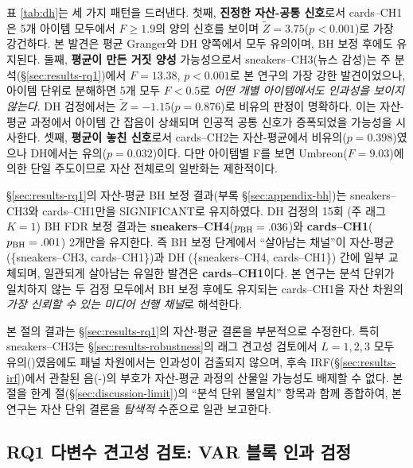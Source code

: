 \documentclass[11pt, a4paper, twocolumn]{article}
\begin{document}
표 \ref{tab:dh}는 세 가지 패턴을 드러낸다. 첫째, \textbf{진정한 자산-공통
신호}로서 cards--CH1은 5개 아이템 모두에서 $F\geq 1.9$의 양의 신호를
보이며 $\tilde{Z}=3.75$($p<0.001$)로 가장 강건하다. 본 발견은 평균
Granger와 DH 양쪽에서 모두 유의이며, BH 보정 후에도 유지된다. 둘째,
\textbf{평균이 만든 거짓 양성} 가능성으로서 sneakers--CH3(뉴스 감성)는
주 분석(\S\ref{sec:results-rq1})에서 $F=13.38$, $p<0.001$로 본 연구의
가장 강한 발견이었으나, 아이템 단위로 분해하면 5개 모두 $F<0.5$로
\emph{어떤 개별 아이템에서도 인과성을 보이지 않는다}. DH 검정에서는
$\tilde{Z}=-1.15$($p=0.876$)로 비유의 판정이 명확하다. 이는 자산-평균
과정에서 아이템 간 잡음이 상쇄되며 인공적 공통 신호가 증폭되었을
가능성을 시사한다. 셋째, \textbf{평균이 놓친 신호}로서 cards--CH2는
자산-평균에서 비유의($p=0.398$)였으나 DH에서는 유의($p=0.032$)이다.
다만 아이템별 F를 보면 Umbreon($F=9.03$)에 의한 단일 주도이므로 자산
전체로의 일반화는 제한적이다.

\S\ref{sec:results-rq1}의 자산-평균 BH 보정 결과(부록 \S\ref{sec:appendix-bh})는
sneakers--CH3와 cards--CH1만을 SIGNIFICANT로 유지하였다. DH 검정의 15회
(주 래그 $K=1$) BH FDR 보정 결과는 \textbf{sneakers--CH4}($p_{\rm BH}=.036$)와
\textbf{cards--CH1}($p_{\rm BH}=.001$) 2개만을 유지한다. 즉 BH 보정 단계에서
``살아남는 채널''이 자산-평균(\{sneakers--CH3, cards--CH1\})과 DH
(\{sneakers--CH4, cards--CH1\}) 간에 일부 교체되며, 일관되게 살아남는
유일한 발견은 \textbf{cards--CH1}이다. 본 연구는 분석 단위가 일치하지
않는 두 검정 모두에서 BH 보정 후에도 유지되는 cards--CH1을 자산 차원의
\emph{가장 신뢰할 수 있는 미디어 선행 채널}로 해석한다.

본 절의 결과는 \S\ref{sec:results-rq1}의 자산-평균 결론을 부분적으로
수정한다. 특히 sneakers--CH3는 \S\ref{sec:results-robustness}의 래그
견고성 검토에서 $L=1,2,3$ 모두 유의(\checkmark)였음에도 패널 차원에서는
인과성이 검출되지 않으며, 후속 IRF(\S\ref{sec:results-irf})에서 관찰된
음(-)의 부호가 자산-평균 과정의 산물일 가능성도 배제할 수 없다. 본 절을
한계 절(\S\ref{sec:discussion-limit})의 ``분석 단위 불일치'' 항목과 함께
종합하여, 본 연구는 자산 단위 결론을 \emph{탐색적} 수준으로 일관 보고한다.

\subsection{RQ1 다변수 견고성 검토: VAR 블록 인과 검정}
\label{sec:results-var}
\end{document}

